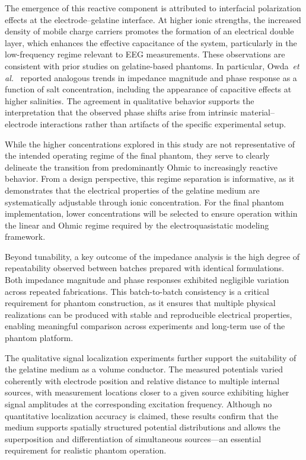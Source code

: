 The emergence of this reactive component is attributed to interfacial polarization effects
at the electrode--gelatine interface. At higher ionic strengths, the increased density of
mobile charge carriers promotes the formation of an electrical double layer, which enhances
the effective capacitance of the system, particularly in the low-frequency regime relevant
to EEG measurements. These observations are consistent with prior studies on gelatine-based
phantoms. In particular, Owda~\emph{et al.}~\cite{Owda2020} reported analogous trends in
impedance magnitude and phase response as a function of salt concentration, including the
appearance of capacitive effects at higher salinities. The agreement in qualitative behavior
supports the interpretation that the observed phase shifts arise from intrinsic
material--electrode interactions rather than artifacts of the specific experimental setup.

While the higher concentrations explored in this study are not representative of the
intended operating regime of the final phantom, they serve to clearly delineate the
transition from predominantly Ohmic to increasingly reactive behavior. From a design
perspective, this regime separation is informative, as it demonstrates that the electrical
properties of the gelatine medium are systematically adjustable through ionic concentration.
For the final phantom implementation, lower concentrations will be selected to ensure
operation within the linear and Ohmic regime required by the electroquasistatic modeling
framework.

Beyond tunability, a key outcome of the impedance analysis is the high degree of
repeatability observed between batches prepared with identical formulations. Both impedance
magnitude and phase responses exhibited negligible variation across repeated fabrications.
This batch-to-batch consistency is a critical requirement for phantom construction, as it
ensures that multiple physical realizations can be produced with stable and reproducible
electrical properties, enabling meaningful comparison across experiments and long-term use
of the phantom platform.

The qualitative signal localization experiments further support the suitability of the
gelatine medium as a volume conductor. The measured potentials varied coherently with
electrode position and relative distance to multiple internal sources, with measurement
locations closer to a given source exhibiting higher signal amplitudes at the corresponding
excitation frequency. Although no quantitative localization accuracy is claimed, these
results confirm that the medium supports spatially structured potential distributions and
allows the superposition and differentiation of simultaneous sources—an essential
requirement for realistic phantom operation.
